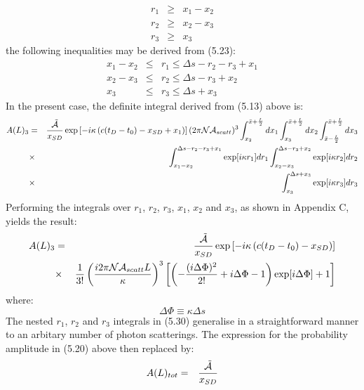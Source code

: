 \documentclass [12pt]{article}
\begin{document}
{      \begin{eqnarray}
       r_1 & \ge & x_1-x_2 \\
       r_2 & \ge & x_2-x_3 \\
       r_3 & \ge & x_3
       \end{eqnarray}
      the following inequalities may be derived from (5.23):
      \begin{eqnarray}
   x_1-x_2 & \le & r_1 \le  \Delta s-r_2-r_3+x_1 \\
   x_2-x_3 & \le & r_2 \le  \Delta s-r_3+x_2 \\
   x_3 & \le &  r_3 \le  \Delta s+x_3
    \end{eqnarray}
    In the present case, the definite integral derived from (5.13) above is:
    \begin{eqnarray}
   A(L)_3 & = & \frac{\tilde{{\cal A}}}{x_{SD}}
   \exp\left[ - i \kappa\left(c(t_D-t_0)-x_{SD}+x_1 \right)\right](2 \pi {\cal N}{\cal A}_{scatt})^3
   \int_{x_2}^{\bar{x} +\frac{L}{2}} d x_1  \int_{x_3}^{\bar{x} +\frac{L}{2}} d x_2
   \int_{\bar{x} -\frac{L}{2}}^{\bar{x} +\frac{L}{2}} dx_3 
   \nonumber \\
      & \times &  \int_{x_1-x_2}^{\Delta s-r_2-r_3+x_1} \exp[i\kappa r_1]  d r_1
   \int_{x_2-x_3}^{\Delta s-r_3+x_2} \exp[i\kappa r_2]  d r_2
    \nonumber \\
     & \times & \int_{x_3}^{\Delta s+x_3} \exp[i\kappa r_3]  d r_3 
  \end{eqnarray}
  Performing the integrals over $r_1$, $r_2$, $r_3$, $x_1$, $x_2$ and $x_3$, as shown in
   Appendix C, yields the result:
   \begin{eqnarray}
     A(L)_3 & = & \frac{\tilde{{\cal A}}}{x_{SD}}
      \exp\left[ - i \kappa\left(c(t_D-t_0)-x_{SD}\right)\right] \nonumber \\
       & \times  & \frac{1}{3!}\left(\frac{i 2 \pi {\cal N}{\cal A}_{scatt} L}{\kappa}\right)^3
        \left[\left(-\frac{(i\Delta \Phi)^2}{2!} + i \Delta \Phi -1\right)\exp[i \Delta \Phi]+1\right]
    \end{eqnarray}
     where:
     \begin{equation}
     \Delta \Phi \equiv \kappa  \Delta s
     \end{equation}
     The nested $r_1$, $r_2$ and $r_3$ integrals in (5.30) generalise in a straightforward
     manner to an arbitary number of photon scatterings. The expression for the probability amplitude
     in (5.20) above then replaced by:
  \begin{eqnarray}
      A(L)_{tot} & = &  \frac{\tilde{{\cal A}}}{x_{SD}}

\end{eqnarray}}
\end{document}
